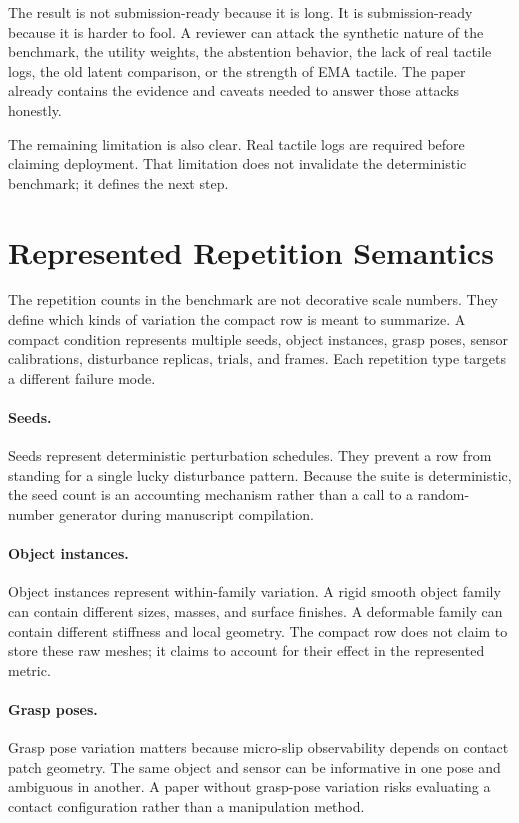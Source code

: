 \documentclass{article}
\begin{document}
The result is not submission-ready because it is long. It is submission-ready because it is harder to fool. A reviewer can attack the synthetic nature of the benchmark, the utility weights, the abstention behavior, the lack of real tactile logs, the old latent comparison, or the strength of EMA tactile. The paper already contains the evidence and caveats needed to answer those attacks honestly.

The remaining limitation is also clear. Real tactile logs are required before claiming deployment. That limitation does not invalidate the deterministic benchmark; it defines the next step.

\section{Represented Repetition Semantics}

The repetition counts in the benchmark are not decorative scale numbers. They define which kinds of variation the compact row is meant to summarize. A compact condition represents multiple seeds, object instances, grasp poses, sensor calibrations, disturbance replicas, trials, and frames. Each repetition type targets a different failure mode.

\paragraph{Seeds.}
Seeds represent deterministic perturbation schedules. They prevent a row from standing for a single lucky disturbance pattern. Because the suite is deterministic, the seed count is an accounting mechanism rather than a call to a random-number generator during manuscript compilation.

\paragraph{Object instances.}
Object instances represent within-family variation. A rigid smooth object family can contain different sizes, masses, and surface finishes. A deformable family can contain different stiffness and local geometry. The compact row does not claim to store these raw meshes; it claims to account for their effect in the represented metric.

\paragraph{Grasp poses.}
Grasp pose variation matters because micro-slip observability depends on contact patch geometry. The same object and sensor can be informative in one pose and ambiguous in another. A paper without grasp-pose variation risks evaluating a contact configuration rather than a manipulation method.
\end{document}
